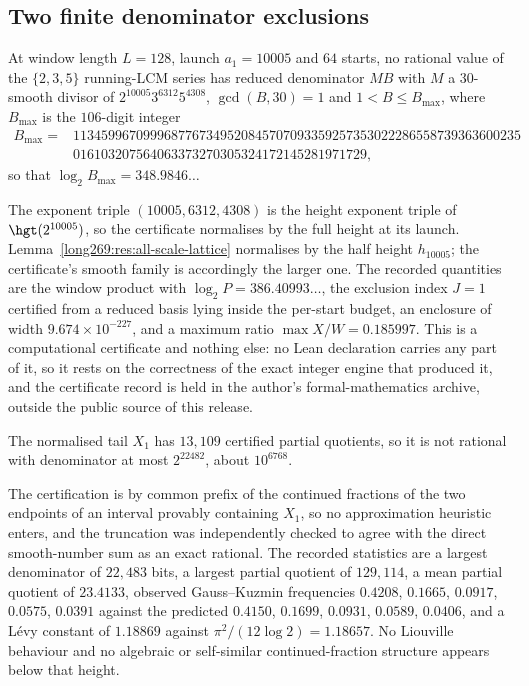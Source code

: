 \subsection{Two finite denominator exclusions}

\begin{theorem}
\label{long269:res:lead-block-exclusion}
At window length $L=128$, launch $a_1=10005$ and $64$ starts, no rational value
of the $\{2,3,5\}$ running-LCM series has reduced denominator $MB$ with $M$ a
$30$-smooth divisor of $2^{10005}3^{6312}5^{4308}$, $\gcd(B,30)=1$ and
$1<B\le B_{\max}$, where $B_{\max}$ is the $106$-digit integer
\[
\begin{aligned}
 B_{\max}={}&1134599670999687767349520845707093359257353022286558739363600235\\
 &016103207564063373270305324172145281971729 ,
\end{aligned}
\]
so that $\log_2B_{\max}=348.9846\ldots$
\end{theorem}

The exponent triple $(10005,6312,4308)$ is the height exponent triple of
$\hgt(2^{10005})$, so the certificate normalises by the full height at its
launch.  Lemma~\ref{long269:res:all-scale-lattice} normalises by the half height
$h_{10005}$; the certificate's smooth family is accordingly the larger one.  The recorded quantities are the window product with
$\log_2P=386.40993\ldots$, the exclusion index $J=1$ certified from a reduced
basis lying inside the per-start budget, an enclosure of width
$9.674\times10^{-227}$, and a maximum ratio $\max X/W=0.185997$.  This is a
computational certificate and nothing else: no Lean declaration carries any
part of it, so it rests on the correctness of the exact integer engine that
produced it, and the certificate record is held in the author's
formal-mathematics archive, outside the public source of this release.

\begin{theorem}
\label{long269:res:cf-exclusion}
The normalised tail $X_1$ has $13{,}109$ certified partial quotients, so it is
not rational with denominator at most $2^{22482}$, about $10^{6768}$.
\end{theorem}

The certification is by common prefix of the continued fractions of the two
endpoints of an interval provably containing $X_1$, so no approximation
heuristic enters, and the truncation was independently checked to agree with
the direct smooth-number sum as an exact rational.  The recorded statistics are
a largest denominator of $22{,}483$ bits, a largest partial quotient of
$129{,}114$, a mean partial quotient of $23.4133$, observed Gauss--Kuzmin
frequencies $0.4208$, $0.1665$, $0.0917$, $0.0575$, $0.0391$ against the
predicted $0.4150$, $0.1699$, $0.0931$, $0.0589$, $0.0406$, and a L\'evy
constant of $1.18869$ against $\pi^{2}/(12\log2)=1.18657$.  No Liouville
behaviour and no algebraic or self-similar continued-fraction structure appears
below that height.

